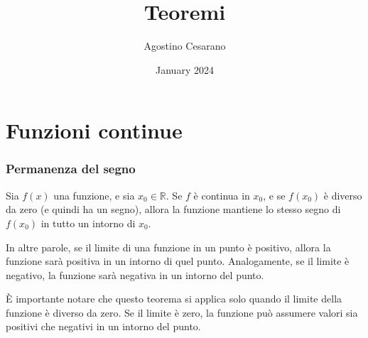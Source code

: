 \documentclass{article}
\title{Teoremi}
\author{Agostino Cesarano}
\date{January 2024}
\begin{document}
\maketitle
{}
\setcounter{part}{1}
\part{Funzioni continue}
\section{Permanenza del segno}
Sia $f(x)$ una funzione, e sia \(x_0 \in \mathbb{R}\). Se \(f\) è continua in
\(x_0\), e se \(f(x_0)\) è diverso da zero (e quindi ha un segno), allora la
funzione mantiene lo stesso segno di \(f(x_0)\) in tutto un intorno di \(x_0\).

In altre parole, se il limite di una funzione in un punto è positivo, allora la
funzione sarà positiva in un intorno di quel punto. Analogamente, se il limite
è negativo, la funzione sarà negativa in un intorno del punto.
\begin{calloutbox}
    È importante notare che questo teorema si applica solo quando il limite della funzione è diverso da zero. Se il limite è zero, la funzione può assumere valori sia positivi che negativi in un intorno del punto.
\end{calloutbox}
\end{document}
